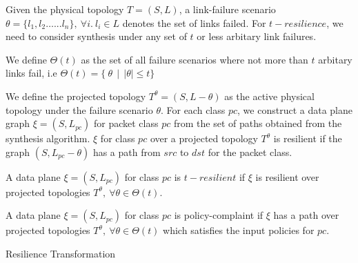 Given the physical topology $T=(S,L)$, a link-failure
scenario $\theta = \{l_1, l_2 \ldots ... l_n\},\ \forall i.\ l_i \in L$ 
denotes the set of links failed. For $t-resilience$, we need to
consider synthesis under any set of $t$ or less arbitary link failures.
\begin{mydef}
	We define $\Theta(t)$ as the set of all failure scenarios where not more than $t$
	arbitary links fail, i.e $\Theta(t) = \{ \ \theta \ \ | \ \ |\theta| \leq t\}$
\end{mydef}
We define the projected topology $T^{\theta} = (S, L - \theta)$ as the active 
physical topology under the failure scenario $\theta$. 	For each class $pc$,
we construct a data plane graph $\xi = (S, L_{pc})$ for packet class $pc$ from the set
of paths obtained from the synthesis algorithm. $\xi$
for class $pc$ over a projected topology $T^\theta$ 
is resilient if the graph $(S, L_{pc} - \theta)$ has a path from $src$ to $dst$ 
for the packet class. 
\begin{mydef}[Resilience]
	A data plane $\xi = (S, L_{pc})$ for class $pc$ is $t-resilient$ if $\xi$ is 
	resilient over projected topologies $T^\theta,\ \forall \theta \in \Theta(t)$.
\end{mydef}
\begin{mydef}
	A data plane $\xi = (S, L_{pc})$ for class $pc$ is policy-complaint if $\xi$ has 
	a path over projected topologies $T^\theta,\ \forall \theta \in \Theta(t)$ which
	satisfies the input policies for $pc$. 
\end{mydef}
\begin{algorithm}[h]
	\begin{footnotesize}
		\caption{Resilience Transformation}
		\label{restransform}
		\begin{algorithmic}[1]
			\vspace*{0.25cm}
			 \label{lst:line:respc}
			\EndFor
			 \label{lst:line:respolicy}
			\EndFor \\
		\end{algorithmic}
	\end{footnotesize}
\end{algorithm}
